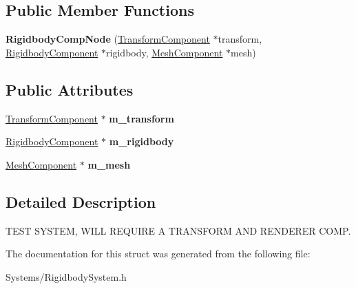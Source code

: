 \subsection*{Public Member Functions}
\begin{DoxyCompactItemize}
\item 
\mbox{\label{structRigidbodyCompNode_a51c74d2b0a39ca6c53d2072657c0c6ac}} 
{\bfseries Rigidbody\+Comp\+Node} (\hyperlink{classTransformComponent}{Transform\+Component} $\ast$transform, \hyperlink{classRigidbodyComponent}{Rigidbody\+Component} $\ast$rigidbody, \hyperlink{classMeshComponent}{Mesh\+Component} $\ast$mesh)
\end{DoxyCompactItemize}
\subsection*{Public Attributes}
\begin{DoxyCompactItemize}
\item 
\mbox{\label{structRigidbodyCompNode_a5539900346b002294494e49f47c5303f}} 
\hyperlink{classTransformComponent}{Transform\+Component} $\ast$ {\bfseries m\+\_\+transform}
\item 
\mbox{\label{structRigidbodyCompNode_a3b4bc2b5d79e293c7a9d55924b3c1ccb}} 
\hyperlink{classRigidbodyComponent}{Rigidbody\+Component} $\ast$ {\bfseries m\+\_\+rigidbody}
\item 
\mbox{\label{structRigidbodyCompNode_a55d5204d79d3ef4e83d442320258a1b8}} 
\hyperlink{classMeshComponent}{Mesh\+Component} $\ast$ {\bfseries m\+\_\+mesh}
\end{DoxyCompactItemize}


\subsection{Detailed Description}
T\+E\+ST S\+Y\+S\+T\+EM, W\+I\+LL R\+E\+Q\+U\+I\+RE A T\+R\+A\+N\+S\+F\+O\+RM A\+ND R\+E\+N\+D\+E\+R\+ER C\+O\+MP. 

The documentation for this struct was generated from the following file\+:\begin{DoxyCompactItemize}
\item 
Systems/Rigidbody\+System.\+h\end{DoxyCompactItemize}
